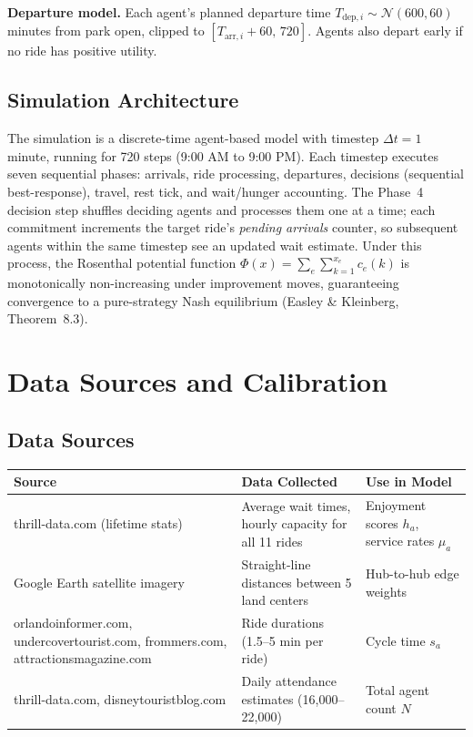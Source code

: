 \documentclass[11pt]{article}
\begin{document}
\textbf{Departure model.} Each agent's planned departure time $T_{\text{dep},i} \sim \mathcal{N}(600, 60)$ minutes from park open, clipped to $[T_{\text{arr},i} + 60,\, 720]$. Agents also depart early if no ride has positive utility.

\subsection{Simulation Architecture}

The simulation is a discrete-time agent-based model with timestep $\Delta t = 1$ minute, running for 720 steps (9:00 AM to 9:00 PM). Each timestep executes seven sequential phases: arrivals, ride processing, departures, decisions (sequential best-response), travel, rest tick, and wait/hunger accounting. The Phase~4 decision step shuffles deciding agents and processes them one at a time; each commitment increments the target ride's \emph{pending arrivals} counter, so subsequent agents within the same timestep see an updated wait estimate. Under this process, the Rosenthal potential function $\Phi(x) = \sum_{e} \sum_{k=1}^{x_e} c_e(k)$ is monotonically non-increasing under improvement moves, guaranteeing convergence to a pure-strategy Nash equilibrium (Easley \& Kleinberg, Theorem~8.3).

\section{Data Sources and Calibration}

\subsection{Data Sources}

\begin{table}[H]
\centering
\begin{tabular}{p{3.5cm}p{5cm}p{5cm}}
\toprule
\textbf{Source} & \textbf{Data Collected} & \textbf{Use in Model} \\
\midrule
thrill-data.com (lifetime stats) & Average wait times, hourly capacity for all 11 rides & Enjoyment scores $h_a$, service rates $\mu_a$ \\
Google Earth satellite imagery & Straight-line distances between 5 land centers & Hub-to-hub edge weights \\
orlandoinformer.com, undercovertourist.com, frommers.com, attractionsmagazine.com & Ride durations (1.5--5 min per ride) & Cycle time $s_a$ \\
thrill-data.com, disneytouristblog.com & Daily attendance estimates (16,000--22,000) & Total agent count $N$ \\
\bottomrule
\end{tabular}
\end{table}
\end{document}
